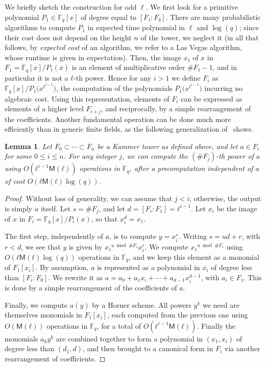 \documentclass{lms}
\newtheorem{lem}[thm]{Lemma}
\def\cout#1{\mathsf{#1}}
\newcommand{\F}{\mathbb{F}}
\newcommand{\MM}{\cout{M}}
\begin{document}
We briefly sketch the construction for odd $\ell$. We first look for a
primitive polynomial $P_1∈\F_q[x]$ of degree equal to $[F₁:F₀]$. There
are many probabilistic algorithms to compute $P_1$ in expected time
polynomial in $\ell$ and $\log(q)$; since their cost does not depend
on the height $n$ of the tower, we neglect it (in all that follows, by
{\em expected cost} of an algorithm, we refer to a Las Vegas algorithm,
whose runtime is given in expectation). Then, the image $x₁$ of
$x$ in $F_1=\F_q[x]/P₁(x)$ is an element of multiplicative order
$\#F₁-1$, and in particular it is not a $ℓ$-th power. Hence for any
$i>1$ we define $F_i$ as $\F_q[x]/P_1\bigl(x^{ℓ^{i-1}}\bigr)$, the
computation of the polynomials $P_1\bigl(x^{ℓ^{i-1}}\bigr)$ incurring
no algebraic cost. Using this representation, elements of $F_i$ can be
expressed as elements of a higher level $F_{i+j}$, and reciprocally,
by a simple rearrangement of the coefficients. Another fundamental
operation can be done much more efficiently than in generic finite
fields, as the following generalization of~\cite[\S2.3]{DoSc12} shows.

\begin{lem}\label{lemma:frob-ell}
  Let $F_0⊂\cdots⊂F_n$ be a Kummer tower as defined above, and let
  $a∈F_i$ for some $0≤i≤n$. For any integer $j$, we can compute the
  $(\#F_j)$-th power of $a$ using $O(ℓ^{i-1}\MM(ℓ))$ operations in
  $\F_q$, after a precomputation independent of $a$ of cost
  $O(ℓ\MM(ℓ)\log(q))$.
\end{lem}
\begin{proof}
  Without loss of generality, we can assume that $j<i$; otherwise, the
  output is simply $a$ itself.  Let $s=\#F_j$, and let
  $d=[F_i:F_1]=ℓ^{i-1}$. Let $x_i$ be the image of $x$ in
  $F_i=\F_q[x]/P_i(x)$, so that $x_i^d=x_1$.

  The first step, independently of $a$, is to compute
  $y=x_i^s$. Writing $s = ud + r$, with $r<d$, we see that $y$ is
  given by $x₁^{u \bmod \#F₁}x_i^r$. We compute $x₁^{u\bmod\#F₁}$
  using $O(ℓ\MM(ℓ)\log(q))$ operations in $\F_q$, and we keep this
  element as a monomial of $F₁[x_i]$.
  By assumption, $a$ is represented as a polynomial in $x_i$ of degree
  less than $[F_i:F_0]$. We rewrite it as
  $a =a_0 + a_1 x_i + \cdots + a_{d-1} x_i^{d-1}$, with $a_i∈F₁$. This
  is done by a simple rearrangement of the coefficients of $a$.

  Finally, we compute $a(y)$ by a Horner scheme. All powers $y^k$ we
  need are themselves monomials in $F₁[x_i]$, each computed from the
  previous one using $O(\MM(ℓ))$ operations in $\F_q$, for a total of
  $O(ℓ^{i-1}\MM(ℓ))$. Finally the monomials $a_ky^k$ are combined
  together to form a polynomial in $(x_1,x_i)$ of degree less than
  $(d_1,d)$, and then brought to a canonical form in $F_i$ via another
  rearrangement of coefficients.
\end{proof}
\end{document}
